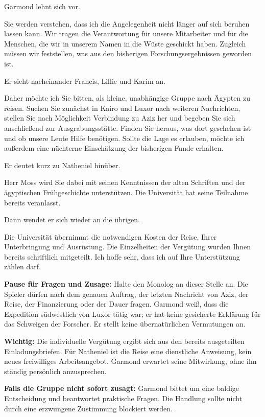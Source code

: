 \begin{vorlesetextalle}
Garmond lehnt sich vor.

\glqq{}Sie werden verstehen, dass ich die Angelegenheit nicht länger auf sich beruhen lassen kann. Wir tragen die Verantwortung für unsere Mitarbeiter und für die Menschen, die wir in unserem Namen in die Wüste geschickt haben. Zugleich müssen wir feststellen, was aus den bisherigen Forschungsergebnissen geworden ist.\grqq{}

Er sieht nacheinander Francis, Lillie und Karim an.

\glqq{}Daher möchte ich Sie bitten, als kleine, unabhängige Gruppe nach Ägypten zu reisen. Suchen Sie zunächst in Kairo und Luxor nach weiteren Nachrichten, stellen Sie nach Möglichkeit Verbindung zu Aziz her und begeben Sie sich anschlie\ss{}end zur Ausgrabungsstätte. Finden Sie heraus, was dort geschehen ist und ob unsere Leute Hilfe benötigen. Sollte die Lage es erlauben, möchte ich au\ss{}erdem eine nüchterne Einschätzung der bisherigen Funde erhalten.\grqq{}

Er deutet kurz zu Natheniel hinüber.

\glqq{}Herr Moss wird Sie dabei mit seinen Kenntnissen der alten Schriften und der ägyptischen Frühgeschichte unterstützen. Die Universität hat seine Teilnahme bereits veranlasst.\grqq{}

Dann wendet er sich wieder an die übrigen.

\glqq{}Die Universität übernimmt die notwendigen Kosten der Reise, Ihrer Unterbringung und Ausrüstung. Die Einzelheiten der Vergütung wurden Ihnen bereits schriftlich mitgeteilt. Ich hoffe sehr, dass ich auf Ihre Unterstützung zählen darf.\grqq{}
\end{vorlesetextalle}

\begin{meisterinfo}
\textbf{Pause für Fragen und Zusage:} Halte den Monolog an dieser Stelle an. Die Spieler dürfen nach dem genauen Auftrag, der letzten Nachricht von Aziz, der Reise, der Finanzierung oder der Dauer fragen. Garmond wei\ss{}, dass die Expedition südwestlich von Luxor tätig war; er hat keine gesicherte Erklärung für das Schweigen der Forscher. Er stellt keine übernatürlichen Vermutungen an.

\textbf{Wichtig:} Die individuelle Vergütung ergibt sich aus den bereits ausgeteilten Einladungsbriefen. Für Natheniel ist die Reise eine dienstliche Anweisung, kein neues freiwilliges Arbeitsangebot. Garmond erwartet seine Mitwirkung, ohne ihn ständig persönlich anzusprechen.

\textbf{Falls die Gruppe nicht sofort zusagt:} Garmond bittet um eine baldige Entscheidung und beantwortet praktische Fragen. Die Handlung sollte nicht durch eine erzwungene Zustimmung blockiert werden.
\end{meisterinfo}

